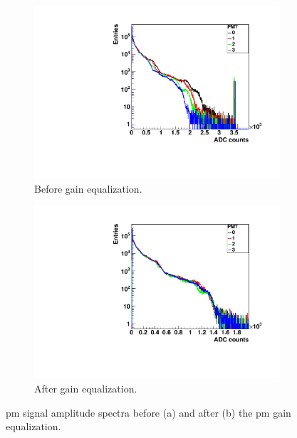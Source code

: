 \begin{figure}
\begin{subfigure}[t]{0.5\textwidth}
\centering
\includegraphics[width=1\textwidth]{03_GraphicFiles/chapter3_CLaRySproto/Absorber/images_charResults_Na22/1_Raw_PMAmp.pdf}
\caption{Before gain equalization.}
\label{chap3::fig::absPM_rawProfiles}
\end{subfigure}
\begin{subfigure}[t]{0.5\textwidth}
\centering
\includegraphics[width=1\textwidth]{03_GraphicFiles/chapter3_CLaRySproto/Absorber/images_charResults_Na22/2_Cal_PMAmp_noSum.pdf}
\caption{After gain equalization.}
\label{chap3::fig::absPM_calProfiles}
\end{subfigure}
\caption{\gls{pm} signal amplitude spectra before (a) and after (b) the \gls{pm} gain equalization.}
\label{chap3::fig::absPM_amp}
\end{figure}

